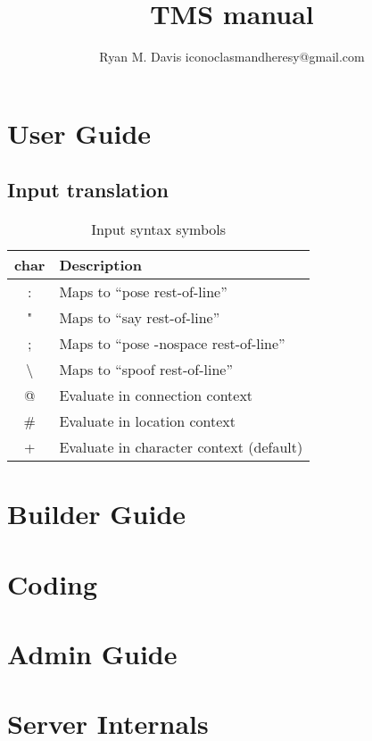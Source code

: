 \documentclass[10pt,letterpaper,twoside]{book}
\author{Ryan M. Davis iconoclasmandheresy@gmail.com}
\title{TMS manual}
\begin{document}
\pagestyle{empty}
\maketitle
\frontmatter
\pagestyle{headings}
\tableofcontents
\listoftables
\mainmatter
\part{User Guide}
\chapter{Input translation}
\begin{table}
\begin{tabular}{c p{}}
char & Description\\
\hline
: & Maps to ``pose rest-of-line''\\
" & Maps to ``say rest-of-line''\\
; & Maps to ``pose -nospace rest-of-line''\\
\textbackslash & Maps to ``spoof rest-of-line''\\
@ & Evaluate in connection context\\
\# & Evaluate in location context\\
+ & Evaluate in character context (default)\\
\hline
\end{tabular}
\caption{Input syntax symbols}
\label{tab:inputsyntaxchars}
\end{table}
\part{Builder Guide}
\part{Coding}
\part{Admin Guide}
\part{Server Internals}
\end{document}
